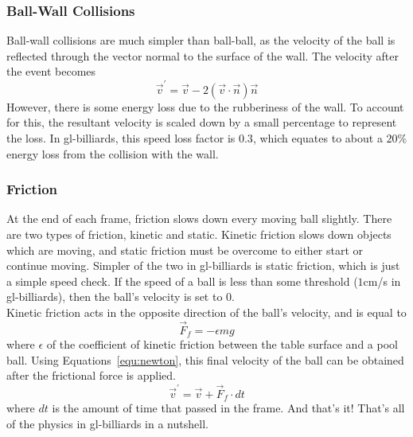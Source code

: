         \subsubsection{Ball-Wall Collisions}
        Ball-wall collisions are much simpler than ball-ball, as the velocity of the ball is reflected through the vector normal to the
        surface of the wall. The velocity after the event becomes
        \begin{equation}
            \vec v^\prime = \vec v - 2 (\vec v \cdot \vec n) \vec n
            \label{equ:after_ball_wall}
        \end{equation}
        However, there is some energy loss due to the rubberiness of the wall. To account for this, the resultant velocity is scaled down by
        a small percentage to represent the loss. In gl-billiards, this speed loss factor is $0.3$, which equates to about a $20\%$ energy
        loss from the collision with the wall.\\
        
        \subsubsection{Friction}
        At the end of each frame, friction slows down every moving ball slightly. There are two types of friction, kinetic and static.
        Kinetic friction slows down objects which are moving, and static friction must be overcome to either start or continue moving.
        Simpler of the two in gl-billiards is static friction, which is just a simple speed check. If the speed of a ball is less than
        some threshold ($1$cm/s in gl-billiards), then the ball's velocity is set to $0$. \\
        Kinetic friction acts in the opposite direction of the ball's velocity, and is equal to
        \begin{equation}
            \vec F_f = -\epsilon m g
            \label{equ:friction}
        \end{equation}
        where $\epsilon$ of the coefficient of kinetic friction between the table surface and a pool ball. Using Equations~\ref{equ:newton},
        this final velocity of the ball can be obtained after the frictional force is applied.
        \begin{equation}
            \vec v^\prime = \vec v + \vec F_f \cdot dt
            \label{equ:friction_velocity}
        \end{equation}
        where $dt$ is the amount of time that passed in the frame. And that's it! That's all of the physics in gl-billiards in a nutshell.
